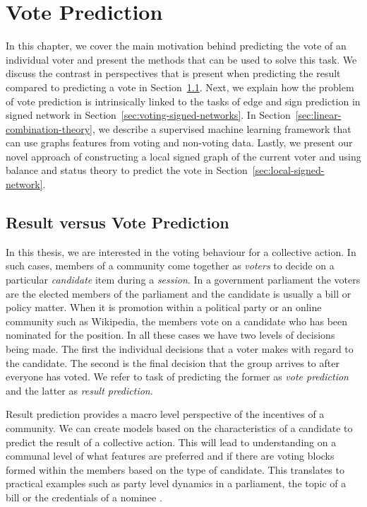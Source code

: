 \chapter{Vote Prediction}
\label{chp:vote-prediction}
In this chapter, we cover the main motivation behind predicting the vote of an individual voter and present the methods that can be used to solve this task. We discuss the contrast in perspectives that is present when predicting the result compared to predicting a vote in Section~\ref{sec:result-vs-vote}. Next, we explain how the problem of vote prediction is intrinsically linked to the tasks of edge and sign prediction in signed network in Section~\ref{sec:voting-signed-networks}. In Section~\ref{sec:linear-combination-theory}, we describe a supervised machine learning framework that can use graphs features from voting and non-voting data. Lastly, we present our novel approach of constructing a local signed graph of the current voter and using balance and status theory to predict the vote in Section~\ref{sec:local-signed-network}. 


\section{Result versus Vote Prediction}
\label{sec:result-vs-vote}
In this thesis, we are interested in the voting behaviour for a collective action. In such cases, members of a community come together as \textit{voters} to decide on a particular \textit{candidate} item during a \textit{session}. In a government parliament  the voters are the elected members of the parliament and the candidate is usually a bill or policy matter. When it is promotion within a political party or an online community such as Wikipedia, the members vote on a candidate who has been nominated for the position. In all these cases we have two levels of decisions being made. The first the individual decisions that a voter makes with regard to the candidate. The second is the final decision that the group arrives to after everyone has voted. We refer to task of predicting the former as \textit{vote prediction} and the latter as \textit{result prediction}. 

Result prediction provides a macro level perspective of the incentives of a community. We can create models based on the characteristics of a candidate to predict the result of a collective action. This will lead to understanding on a communal level of what features are preferred and if there are voting blocks formed within the members based on the type of candidate. This translates to practical examples such as party level dynamics in a parliament, the topic of a bill or the credentials of a nominee \cite{burke2008mopping,yano2012textual,yogatama-etal-2011-predicting}. 

